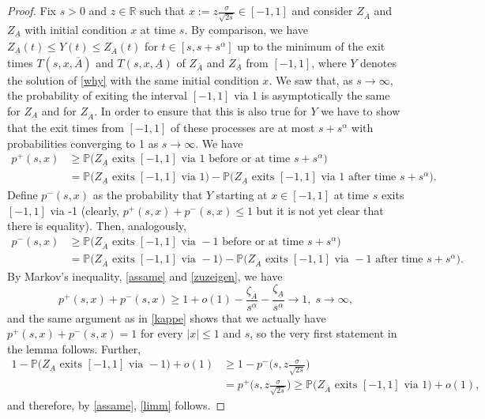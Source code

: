 \documentclass[10pt,a4paper]{amsart}
\def\P{\mathbb P}
\def\R{\mathbb R}
\renewcommand{\bar}{\overline}
\begin{document}
\begin{proof}
Fix $s >0$ and $z \in \R$ such that $x:=z\frac{\sigma}{\sqrt{2s}}\in[-1,1]$ and consider  $Z_{\bar A}$ and $Z_{\underline A}$ with initial condition $x$ at time $s$.
By comparison, we have $Z_{\underline A}(t)\leq Y(t) \leq Z_{\overline A}(t)$ for $t \in [s,s+s^\alpha]$ up to the minimum of the exit times $T(s,x,\bar A)$ and  $T(s,x,\underline A)$ of
$Z_{\overline A}$ and $Z_{\underline A}$ from $[-1,1]$, where $Y$ denotes the solution of \eqref{why} with the same initial condition $x$.  We saw that, as $s \to \infty$, the probability of exiting the
interval $[-1,1]$ via 1 is asymptotically the same for   $Z_{\underline A}$ and for $Z_{\bar A}$. In order to ensure that this is also true for $Y$ we have to show that the exit times from $[-1,1]$
of these processes are at most $s+s^{\alpha}$ with probabilities converging to 1 as $s \to \infty$. We have
\begin{align*}
  p^+(s,x)&\geq \P\big(Z_{\underline{A}}\mbox{ exits }[-1,1] \mbox{ via } 1 \mbox{ before or at time } s+s^{\alpha}\big)\\
  &=\P\big( Z_{\underline{A}}\mbox{ exits }[-1,1] \mbox{ via } 1\big)-  \P\big(Z_{\underline{A}}\mbox{ exits }[-1,1] \mbox{ via } 1 \mbox{ after time }s+s^{\alpha}\big).
\end{align*}
Define $p^-(s,x)$ as the probability that $Y$ starting at $x\in [-1,1]$ at time $s$ exits $[-1,1]$ via -1 (clearly, $p^+(s,x)+p^-(s,x)\leq 1$ but it is not yet clear that there is equality). Then, analogously,
\begin{align*}
  p^-(s,x)&\geq \P\big(Z_{\bar{A}}\mbox{ exits }[-1,1] \mbox{ via } -1 \mbox{ before or at time } s+s^{\alpha}\big)\\
  &=\P\big( Z_{\bar{A}}\mbox{ exits }[-1,1] \mbox{ via } -1\big)-  \P\big(Z_{\bar{A}}\mbox{ exits }[-1,1] \mbox{ via } -1 \mbox{ after time }s+s^{\alpha}\big).
\end{align*}  
By Markov's inequality, \eqref{assame} and \eqref{zuzeigen}, we have
$$
 p^+(s,x)+ p^-(s,x)\geq 1+o(1)-\frac{\zeta_{\bar A}}{s^{\alpha}}- \frac{\zeta_{\underline A}}{s^{\alpha}}\to 1,\;s \to \infty,
 $$
 and the same argument as in \eqref{kappe} shows that we actually have $ p^+(s,x)+ p^-(s,x)=1$ for every $|x|\leq 1$ and $s$, so the very first statement in the lemma follows. Further,
 \begin{align*}
   1-\P\big( Z_{\underline{A}}\mbox{ exits }[-1,1] \mbox{ via } -1\big)+o(1)&\geq 1-p^-\big(s,z\frac {\sigma}{\sqrt{2s}}\big)\\
   &=p^+\big(s,z\frac {\sigma}{\sqrt{2s}}\big)\geq \P\big( Z_{\bar{A}}\mbox{ exits }[-1,1] \mbox{ via } 1\big)+o(1),
\end{align*}
and therefore, by \eqref{assame}, \eqref{limm} follows.




\end{proof}
\end{document}
